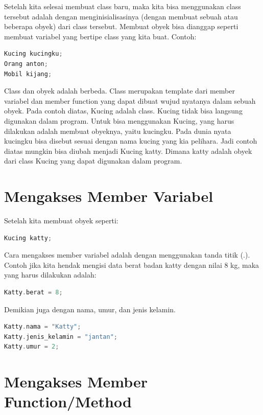 Setelah kita selesai membuat class baru, maka kita bisa menggunakan
class tersebut adalah dengan menginisialisasinya (dengan membuat sebuah
atau beberapa obyek) dari class tersebut. Membuat obyek bisa dianggap
seperti membuat variabel yang bertipe class yang kita buat. Contoh:

\begin{lstlisting}[language=c++]
Kucing kucingku;
Orang anton;
Mobil kijang;
\end{lstlisting}

Class dan obyek adalah berbeda. Class merupakan template dari member
variabel dan member function yang dapat dibuat wujud nyatanya dalam
sebuah obyek. Pada contoh diatas, Kucing adalah class. Kucing tidak bisa
langsung digunakan dalam program. Untuk bisa menggunakan Kucing, yang
harus dilakukan adalah membuat obyeknya, yaitu kucingku. Pada dunia
nyata kucingku bisa disebut sesuai dengan nama kucing yang kia pelihara.
Jadi contoh diatas mungkin bisa diubah menjadi Kucing katty. Dimana
katty adalah obyek dari class Kucing yang dapat digunakan dalam program.

\section{Mengakses Member Variabel}\label{mengakses-member-variabel}

Setelah kita membuat obyek seperti:

\begin{lstlisting}[language=c++]
Kucing katty;
\end{lstlisting}

Cara mengakses member variabel adalah dengan menggunakan tanda titik
(.). Contoh jika kita hendak mengisi data berat badan katty dengan nilai
8 kg, maka yang harus dilakukan adalah:

\begin{lstlisting}[language=c++]
Katty.berat = 8;
\end{lstlisting}

Demikian juga dengan nama, umur, dan jenis kelamin.

\begin{lstlisting}[language=c++]
Katty.nama = "Katty";
Katty.jenis_kelamin = "jantan";
Katty.umur = 2;
\end{lstlisting}

\section{Mengakses Member
Function/Method}\label{mengakses-member-functionmethod}

